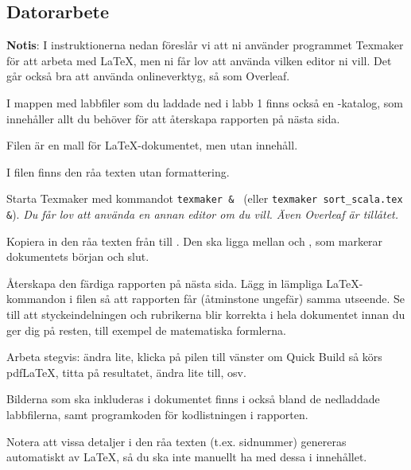 \newpage

\subsection*{Datorarbete}

\textbf{Notis}: I instruktionerna nedan föreslår vi att ni använder programmet Texmaker för att arbeta med \LaTeX, men ni får lov att använda vilken editor ni vill. Det går också bra att använda onlineverktyg, så som Overleaf.

\begin{Datorarbete}
	\item I mappen med labbfiler som du laddade ned i labb 1 finns också en -katalog, som innehåller allt du behöver för att återskapa rapporten på nästa sida.
	\item Filen  är en mall för \LaTeX-dokumentet, men utan innehåll.
    \item I filen  finns den råa texten utan formattering.
	\item Starta Texmaker med kommandot \verb/texmaker & / (eller \verb/texmaker sort_scala.tex &/). \emph{Du får lov att använda en annan editor om du vill. Även Overleaf är tillåtet.}
	\item Kopiera in den råa texten från  till . Den ska ligga mellan \verb// och \verb//, som markerar dokumentets början och slut.
	\item Återskapa den färdiga rapporten på nästa sida. Lägg in lämpliga \LaTeX-kommandon i filen så att rapporten får (åtminstone ungefär) samma utseende. Se till att styckeindelningen och rubrikerna blir korrekta i hela dokumentet innan du ger dig på resten, till exempel de matematiska formlerna.

	Arbeta stegvis: ändra lite, klicka på pilen till vänster om Quick Build så körs pdfLaTeX, titta på resultatet, ändra lite till, osv.

	Bilderna som ska inkluderas i dokumentet finns i också bland de nedladdade labbfilerna, samt programkoden för kodlistningen i rapporten.

    Notera att vissa detaljer i den råa texten (t.ex. sidnummer) genereras automatiskt av \LaTeX, så du ska inte manuellt ha med dessa i innehållet.

    \smallskip


\end{Datorarbete}
